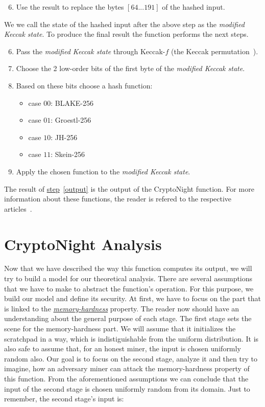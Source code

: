 \begin{enumerate}
  \setcounter{enumi}{5}
  \item \label{modified} Use the result to replace the bytes $[64...191]$ of the hashed input.
\end{enumerate}
We we call the state of the hashed input after the above step as the \emph{modified Keccak state}. To produce the final result the function performs the next steps.

\begin{enumerate}
  \setcounter{enumi}{5}
  \item Pass the \emph{modified Keccak state} through Keccak-$f$ (the Keccak permutation~\cite{keccak}).
  \item Choose the 2 low-order bits of the first byte of the \emph{modified Keccak state}.
  \item Based on these bits choose a hash function:
  \begin{itemize}
    \item case $00$: BLAKE-256
    \item case $01$: Groestl-256
    \item case $10$: JH-256
    \item case $11$: Skein-256
  \end{itemize}
  \item \label{output} Apply the chosen function to the \emph{modified Keccak state}.
\end{enumerate}
The result of \hyperref[output]{step}~\ref{output} is the output of the CryptoNight function. For more information about these functions, the reader is refered to the respective articles~\cite{10030667226,sha3groestl,sha3W09,sha3F+08}.

\section{CryptoNight Analysis}
Now that we have described the way this function computes its output, we will try to build a model for our theoretical analysis. There are several assumptions that we have to make to abstract the function's operation. For this purpose, we build our model and define its security. At first, we have to focus on the part that is linked to the \hyperref[sec:memory-hard]{\emph{memory-hardness}} property. The reader now should have an understanding about the general purpose of each stage. The first stage sets the scene for the memory-hardness part. We will assume that it initializes the scratchpad in a way, which is indistiguishable from the uniform distribution. It is also safe to assume that, for an honest miner, the input is chosen uniformly random also. Our goal is to focus on the second stage, analyze it and then try to imagine, how an adversary miner can attack the memory-hardness property of this function. From the aforementioned assumptions we can conclude that the input of the second stage is chosen uniformly random from its domain. Just to remember, the second stage's input is:

